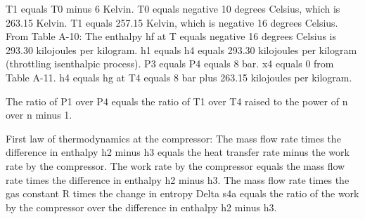 T1 equals T0 minus 6 Kelvin.
T0 equals negative 10 degrees Celsius, which is 263.15 Kelvin.
T1 equals 257.15 Kelvin, which is negative 16 degrees Celsius.
From Table A-10:
The enthalpy hf at T equals negative 16 degrees Celsius is 293.30 kilojoules per kilogram.
h1 equals h4 equals 293.30 kilojoules per kilogram (throttling isenthalpic process).
P3 equals P4 equals 8 bar.
x4 equals 0 from Table A-11.
h4 equals hg at T4 equals 8 bar plus 263.15 kilojoules per kilogram.

The ratio of P1 over P4 equals the ratio of T1 over T4 raised to the power of n over n minus 1.

First law of thermodynamics at the compressor:
The mass flow rate times the difference in enthalpy h2 minus h3 equals the heat transfer rate minus the work rate by the compressor.
The work rate by the compressor equals the mass flow rate times the difference in enthalpy h2 minus h3.
The mass flow rate times the gas constant R times the change in entropy Delta s4a equals the ratio of the work by the compressor over the difference in enthalpy h2 minus h3.